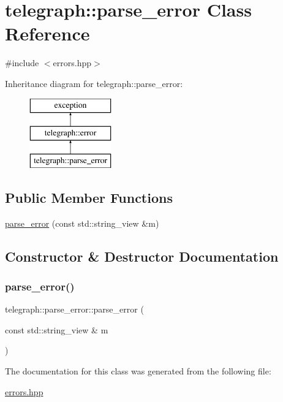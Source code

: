 \hypertarget{classtelegraph_1_1parse__error}{}\section{telegraph\+:\+:parse\+\_\+error Class Reference}
\label{classtelegraph_1_1parse__error}


{\ttfamily \#include $<$errors.\+hpp$>$}

Inheritance diagram for telegraph\+:\+:parse\+\_\+error\+:\begin{figure}[H]
\begin{center}
\leavevmode
\includegraphics[height=3.000000cm]{classtelegraph_1_1parse__error}
\end{center}
\end{figure}
\subsection*{Public Member Functions}
\begin{DoxyCompactItemize}
\item 
\hyperlink{classtelegraph_1_1parse__error_afe18fb7981f6e5a6670709e07d396913}{parse\+\_\+error} (const std\+::string\+\_\+view \&m)
\end{DoxyCompactItemize}


\subsection{Constructor \& Destructor Documentation}
\mbox{\label{classtelegraph_1_1parse__error_afe18fb7981f6e5a6670709e07d396913}} 
\subsubsection{\texorpdfstring{parse\+\_\+error()}{parse\_error()}}
{\footnotesize\ttfamily telegraph\+::parse\+\_\+error\+::parse\+\_\+error (\begin{DoxyParamCaption}\item[{const std\+::string\+\_\+view \&}]{m }\end{DoxyParamCaption})\hspace{0.3cm}{\ttfamily [inline]}}



The documentation for this class was generated from the following file\+:\begin{DoxyCompactItemize}
\item 
\hyperlink{errors_8hpp}{errors.\+hpp}\end{DoxyCompactItemize}
